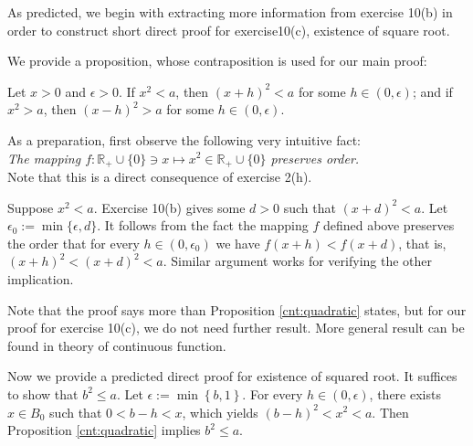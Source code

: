 \documentclass[a4paper,12pt]{article}
\begin{document}
\begin{rem}\label{note:root1}
	As predicted, we begin with extracting more information from exercise 10(b) in order to construct short direct proof for exercise10(c), existence of square root.
	
	We provide a proposition, whose contraposition is used for our main proof:
	\begin{prp}\label{cnt:quadratic}
		Let
		\( x>0 \)
		and
		\( \epsilon > 0\).
		If \( x^2 < a\),
		then
		\( (x+h)^2 < a\)
		for some \( h \in (0,\epsilon) \);
		and if \( x^2 > a\),
		then
		\( (x-h)^2 > a\)
		for some \( h \in (0,\epsilon) \).
	\end{prp}
	\begin{prf}
		As a preparation, first observe the following very intuitive fact:\\
		\textit{The mapping
			\( f:\mathbb{R}_{+}\cup \{0\} \ni x \mapsto x^2 \in \mathbb{R}_{+}\cup \{ 0 \} \)
			preserves order.}\\
		Note that this is a direct consequence of exercise 2(h).
		
		Suppose
		\( x^2 < a\).
		Exercise 10(b) gives some
		\( d>0 \)
		such that
		\( (x+d)^2 < a\).
		Let
		\( \epsilon_0 := \min\{\epsilon, d\} \).
		It follows from the fact the mapping
		\( f \)
		defined above preserves the order that
		for every 
		\( h \in (0,\epsilon_0) \)
		we have
		\( f(x+h)<f(x+d) \),
		that is,
		\( (x+h)^2<(x+d)^2<a \).
		Similar argument works for verifying the other implication.
	\end{prf}
	Note that the proof says more than Proposition \ref{cnt:quadratic} states,
	but for our proof for exercise 10(c), we do not need further result.
	More general result can be found in theory of continuous function.
	
	Now we provide a predicted direct proof for existence of squared root.
	It suffices to show that 
	\( b^2 \le a \).
	Let
	\( \epsilon:=\min \left\{ b,1 \right\} \).
	For every
	\( h \in (0,\epsilon) \),
	there exists
	\( x \in B_0 \)
	such that
	\( 0< b-h<x \),
	which yields
	\( (b-h)^2<x^2<a \).
	Then Proposition \ref{cnt:quadratic} implies
	\( b^2 \le a \).
\end{rem}
\end{document}
